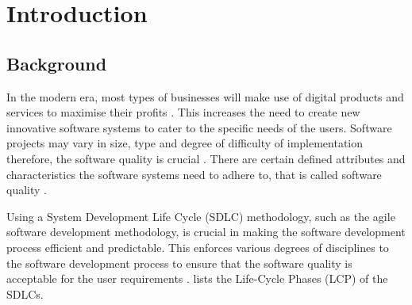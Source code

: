 \chapter{Introduction}
\label{chap:1}

\section{Background}\label{section:ch1_background}
In the modern era, most types of businesses will make use of digital products and services to maximise their profits \cite{Gralha2018}. This increases the need to create new innovative software systems to cater to the specific needs of the users. Software projects may vary in size, type and degree of difficulty of implementation therefore, the software quality is crucial \cite{Khan2013}. There are certain defined attributes and characteristics the software systems need to adhere to, that is called software quality \cite{Khan2013}.\par Using a System Development Life Cycle (SDLC) methodology, such as the agile software development methodology, is crucial in making the software development process efficient and predictable. This enforces various degrees of disciplines to the software development process to ensure that the software quality is acceptable for the user requirements \cite{Khan2013, Al-Saiyd2015}.  lists the Life-Cycle Phases (LCP) of the SDLCs.

